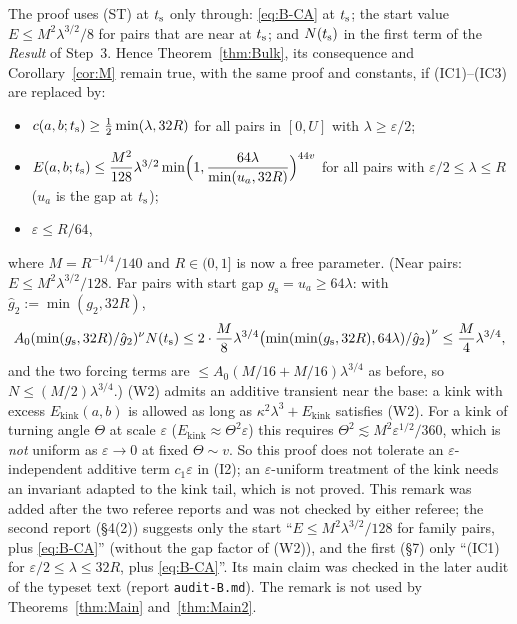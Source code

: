 \begin{remark}\label{rem:B-relaxed}
The proof uses \textup{(ST)} at $t_{\mathrm s}$ only through: \eqref{eq:B-CA} at $t_{\mathrm s}$; the start value $E\le M^2\lambda^{3/2}/8$ for pairs
that are near at $t_{\mathrm s}$; and $N(t_{\mathrm s})$ in the first term of the \emph{Result} of Step~3. Hence Theorem~\ref{thm:Bulk}, its
consequence and Corollary~\ref{cor:M} remain true, with the same proof and constants, if (IC1)--(IC3) are replaced by:
\begin{itemize}
\item[(W1)] $c(a,b;t_{\mathrm s})\ge\frac12\min(\lambda,32R)$ for all pairs in $[0,U]$ with $\lambda\ge\varepsilon/2$;
\item[(W2)] $E(a,b;t_{\mathrm s})\le\dfrac{M^2}{128}\lambda^{3/2}\min\Bigl(1,\dfrac{64\lambda}{\min(u_a,32R)}\Bigr)^{44v}$ for all pairs with
$\varepsilon/2\le\lambda\le R$ ($u_a$ is the gap at $t_{\mathrm s}$);
\item[(W3)] $\varepsilon\le R/64$,
\end{itemize}
where $M=R^{-1/4}/140$ and $R\in(0,1]$ is now a free parameter. (Near pairs: $E\le M^2\lambda^{3/2}/128$. Far pairs with start gap
$g_{\mathrm s}=u_a\ge64\lambda$: with $\hat g_2:=\min(g_2,32R)$,
\[
A_0(\min(g_{\mathrm s},32R)/\hat g_2)^\nu N(t_{\mathrm s})\le2\cdot\frac M8\lambda^{3/4}\bigl(\min(\min(g_{\mathrm s},32R),64\lambda)/\hat g_2\bigr)^\nu
\le\frac M4\lambda^{3/4},
\]
and the two forcing terms are $\le A_0(M/16+M/16)\lambda^{3/4}$ as before, so $N\le(M/2)\lambda^{3/4}$.)
(W2) admits an additive transient near the base: a kink with excess $E_{\mathrm{kink}}(a,b)$ is allowed as long as
$\kappa^2\lambda^3+E_{\mathrm{kink}}$ satisfies (W2). For a kink of turning angle $\Theta$ at scale $\varepsilon$
($E_{\mathrm{kink}}\approx\Theta^2\varepsilon$) this requires $\Theta^2\lesssim M^2\varepsilon^{1/2}/360$, which is \emph{not} uniform as
$\varepsilon\to0$ at fixed $\Theta\sim v$. So this proof does not tolerate an $\varepsilon$-independent additive term $c_1\varepsilon$
in (I2); an $\varepsilon$-uniform treatment of the kink needs an invariant adapted to the kink tail, which is not proved.
This remark was added after the two referee reports and was not checked by either referee; the second report (\S4(2)) suggests
only the start ``$E\le M^2\lambda^{3/2}/128$ for family pairs, plus \eqref{eq:B-CA}'' (without the gap factor of (W2)), and the
first (\S7) only ``(IC1) for $\varepsilon/2\le\lambda\le32R$, plus \eqref{eq:B-CA}''. Its main claim was checked in the later audit
of the typeset text (report \texttt{audit-B.md}). The remark is not used by Theorems~\ref{thm:Main} and~\ref{thm:Main2}.
\end{remark}

